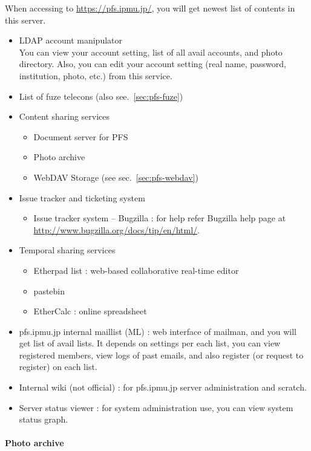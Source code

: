 \documentclass[a4paper,notitlepage]{article}
\begin{document}
When accessing to \url{https://pfs.ipmu.jp/}, you will get newest list of 
contents in this server. 

\begin{itemize}
  \item LDAP account manipulator \\
    You can view your account setting, list of all avail accounts, and photo 
    directory. 
    Also, you can edit your account setting (real name, password, institution, 
    photo, etc.) from this service.
  \item List of fuze telecons (also see.~\ref{sec:pfs-fuze})
  \item Content sharing services
    \begin{itemize}
      \item Document server for PFS
      \item Photo archive
      \item WebDAV Storage (see sec.~\ref{sec:pfs-webdav})
    \end{itemize}
  \item Issue tracker and ticketing system
    \begin{itemize}
      \item Issue tracker system -- Bugzilla : 
        for help refer Bugzilla help page at 
        \url{http://www.bugzilla.org/docs/tip/en/html/}.
    \end{itemize}
  \item Temporal sharing services
    \begin{itemize}
      \item Etherpad list : web-based collaborative real-time editor
      \item pastebin
      \item EtherCalc : online spreadsheet
    \end{itemize}
  \item pfs.ipmu.jp internal maillist (ML) :
    web interface of mailman, and you will get list of avail lists. 
    It depends on settings per each list, you can view registered members, 
    view logs of past emails, and also register (or request to register) on 
    each list. 
  \item Internal wiki (not official) : 
    for pfs.ipmu.jp server administration and scratch. 
  \item Server status viewer : 
    for system administration use, you can view system status graph.
\end{itemize}

\paragraph{Photo archive}
\end{document}
